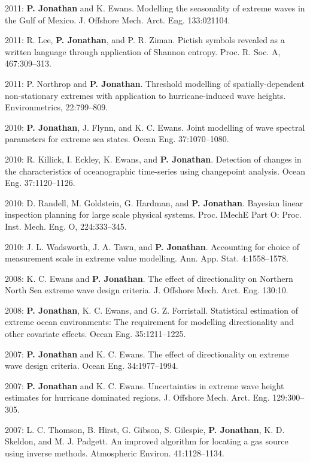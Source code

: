 \documentclass[11pt,a4paper]{moderncv}
\begin{document}
2011: \textbf{P. Jonathan} and K. Ewans. Modelling the seasonality of extreme waves in the Gulf of Mexico. J. Offshore Mech. Arct. Eng. 133:021104.

2011: R. Lee, \textbf{P. Jonathan}, and P. R. Ziman. Pictish symbols revealed as a written language through application of Shannon entropy. Proc. R. Soc. A, 467:309--313.

2011: P. Northrop and \textbf{P. Jonathan}. Threshold modelling of spatially-dependent non-stationary extremes with application to hurricane-induced wave heights. Environmetrics, 22:799--809.

2010: \textbf{P. Jonathan}, J. Flynn, and K. C. Ewans. Joint modelling of wave spectral parameters for extreme sea states. Ocean Eng. 37:1070--1080.

2010: R. Killick, I. Eckley, K. Ewans, and \textbf{P. Jonathan}. Detection of changes in the characteristics of oceanographic time-series using changepoint analysis. Ocean Eng. 37:1120--1126.

2010: D. Randell, M. Goldstein, G. Hardman, and \textbf{P. Jonathan}. Bayesian linear inspection planning for large scale physical systems. Proc. IMechE Part O: Proc. Inst. Mech. Eng. O, 224:333--345.

2010: J. L. Wadsworth, J. A. Tawn, and \textbf{P. Jonathan}. Accounting for choice of measurement scale in extreme value modelling. Ann. App. Stat. 4:1558--1578.

2008: K. C. Ewans and \textbf{P. Jonathan}. The effect of directionality on Northern North Sea extreme wave design criteria. J. Offshore Mech. Arct. Eng. 130:10.

2008: \textbf{P. Jonathan}, K. C. Ewans, and G. Z. Forristall. Statistical estimation of extreme ocean environments: The requirement for modelling directionality and other covariate effects. Ocean Eng. 35:1211--1225.

2007: \textbf{P. Jonathan} and K. C. Ewans. The effect of directionality on extreme wave design criteria. Ocean Eng. 34:1977--1994.

2007: \textbf{P. Jonathan} and K. C. Ewans. Uncertainties in extreme wave height estimates for hurricane dominated regions. J. Offshore Mech. Arct. Eng. 129:300--305.

2007: L. C. Thomson, B. Hirst, G. Gibson, S. Gilespie, \textbf{P. Jonathan}, K. D. Skeldon, and M. J. Padgett. An improved algorithm for locating a gas source using inverse methods. Atmospheric Environ. 41:1128--1134.
\end{document}
